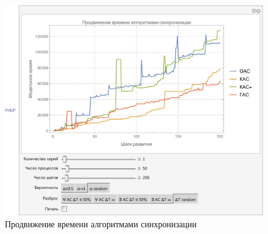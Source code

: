 \begin{figure}[H]
\centering
\includegraphics[scale=0.75]{графика/test.pdf}
\caption{Продвижение времени алгоритмами синхронизации}
\end{figure}












